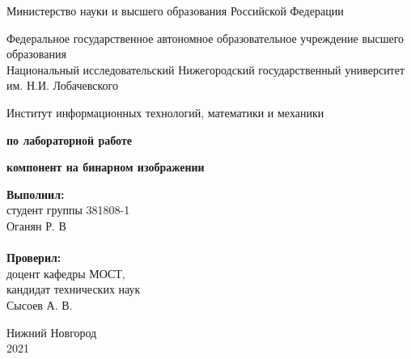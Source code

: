 \documentclass{report}
\begin{document}
\begin{titlepage}

\begin{center}
Министерство науки и высшего образования Российской Федерации
\end{center}

\begin{center}
Федеральное государственное автономное образовательное учреждение высшего образования \\
Национальный исследовательский Нижегородский государственный университет им. Н.И. Лобачевского
\end{center}

\begin{center}
Институт информационных технологий, математики и механики
\end{center}

\vspace{4em}

\begin{center}
\textbf{ по лабораторной работе} \\
\end{center}
\begin{center}
\textbf{ компонент на бинарном изображении} \\
\end{center}

\vspace{4em}

	\newbox{\lbox}
		\newlength{\maxl}
		\setlength{\maxl}{\wd\lbox}
		\hfill\parbox{7cm}{
			\hspace*{5cm}\hspace*{-5cm}\textbf{Выполнил:} \\ студент группы 381808-1 \\ Оганян Р. В\\
			\\
			\hspace*{5cm}\hspace*{-5cm}\textbf{Проверил:}\\ доцент кафедры МОСТ, \\ кандидат технических наук \\ Сысоев А. В.\\
		}
		\vspace{\fill}

		\begin{center} Нижний Новгород \\ 2021 \end{center}

	\end{titlepage}
\end{document}
